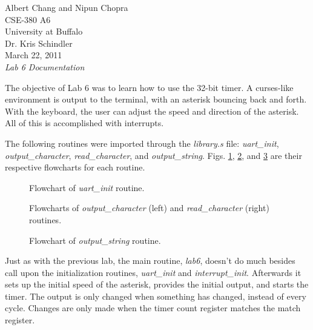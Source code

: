 \documentclass[letterpaper,10pt]{article}
\begin{document}
    Albert Chang and Nipun Chopra\\
    CSE-380 A6\\
    University at Buffalo\\
    Dr. Kris Schindler\\
    March 22, 2011\\
    \textit{Lab 6 Documentation}

    The objective of Lab 6 was to learn how to use the 32-bit timer. A curses-like
    environment is output to the terminal, with an asterisk bouncing back and
    forth. With the keyboard, the user can adjust the speed and direction of
    the asterisk. All of this is accomplished with interrupts.

    The following routines were imported through the \textit{library.s} file:
    \textit{uart\_init}, \textit{output\_character}, \textit{read\_character},
    and \textit{output\_string}. Figs. \ref{flo:uart_init},
    \ref{flo:io_char}, and \ref{flo:output_string} are their respective
    flowcharts for each routine.

    \begin{figure}[h]
        
        \caption{Flowchart of \textit{uart\_init} routine.}
        \label{flo:uart_init}
    \end{figure}

    \begin{figure}[h]
        \begin{minipage}{0.5\linewidth}
            
        \end{minipage}%
        \begin{minipage}{0.5\linewidth}
            
        \end{minipage}
        \caption{Flowcharts of \textit{output\_character} (left) and \textit{read\_character} (right) routines.}
        \label{flo:io_char}
    \end{figure}

    \begin{figure}[h]
        
        \caption{Flowchart of \textit{output\_string} routine.}
        \label{flo:output_string}
    \end{figure}

    \clearpage

    Just as with the previous lab, the main routine, \textit{lab6}, doesn't do
    much besides call upon the initialization routines, \textit{uart\_init} and
    \textit{interrupt\_init}. Afterwards it sets up the initial speed of the
    asterisk, provides the initial output, and starts the timer. The output is
    only changed when something has changed, instead of every cycle. Changes
    are only made when the timer count register matches the match register.
\end{document}
